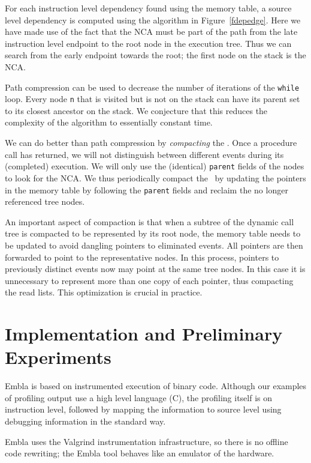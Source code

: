 \documentclass{acm_proc_article-sp}
\begin{document}
For each instruction level dependency found using the memory table,
a source level dependency is computed using the algorithm in 
Figure~\ref{fdepedge}. Here we
have made use of the fact that the NCA must be part of the path from the
late instruction level endpoint to the root node in the execution tree. 
Thus
we can search from the early endpoint towards the root; the first node
on the stack is the NCA.

Path compression can be used to decrease the number of iterations of the 
{\tt while} loop.
Every node {\tt n} that is visited but is not on the stack can have its parent set
to its closest ancestor on the stack. We conjecture that this reduces the 
complexity of the algorithm to essentially constant time. 


We can do better than path compression by {\em compacting} the \tracepile. 
Once a procedure call has returned, we will not distinguish between 
different events during its (completed) execution. We will only use the
(identical) {\tt parent} fields of the nodes to look for the NCA. We 
thus periodically compact the \tracepile\ by updating the pointers in 
the memory table by following the {\tt parent} fields and reclaim the no longer
referenced tree nodes.




An important aspect of compaction is that when a subtree of the dynamic
call tree is compacted to be represented by its root node, the memory table
needs to be updated to avoid dangling pointers to eliminated events. All
pointers are then forwarded to point to the representative nodes. In this
process, pointers to previously distinct events now may point at the same 
tree nodes. In this case it is unnecessary to represent more than one 
copy of each pointer, thus compacting the read lists. This optimization is 
crucial in practice.




\section{Implementation and Preliminary Experiments}

Embla is based on instrumented execution of binary code. Although
our examples of profiling output use a high level language (C),
the profiling itself is on instruction level, followed by 
mapping the information to source level using debugging information 
in the standard way.

Embla uses the Valgrind instrumentation infrastructure, so there
is no offline code rewriting; the Embla tool behaves like an emulator
of the hardware.



\end{document}

